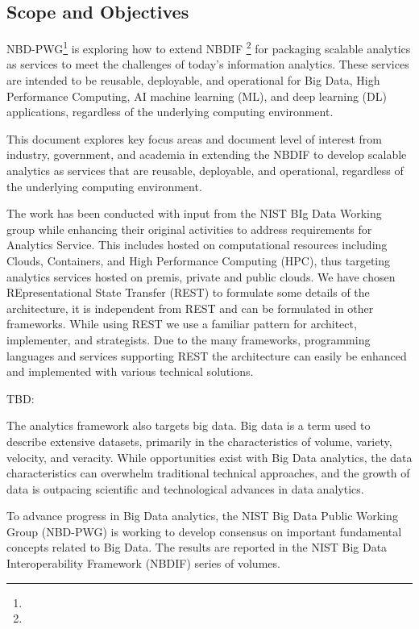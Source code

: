 \begin{description}
{%

\end{description}

\subsection{Scope and Objectives}

NBD-PWG\footnote{} is exploring how to extend NBDIF \footnote{} for packaging scalable
analytics as services to meet the challenges of today's information
analytics. These services are intended to be reusable, deployable, and
operational for Big Data, High Performance Computing, AI machine
learning (ML), and deep learning (DL) applications, regardless of the
underlying computing environment.

This document explores key focus areas and document level of interest
from industry, government, and academia in extending the NBDIF to
develop scalable analytics as services that are reusable, deployable,
and operational, regardless of the underlying computing environment.


The work has been conducted with input from the NIST BIg Data Working
group while enhancing their original activities to address
requirements for Analytics Service. This includes hosted on
computational resources including Clouds, Containers, and High
Performance Computing (HPC), thus targeting analytics services hosted
on premis, private and public clouds. We have chosen REpresentational
State Transfer (REST) to formulate some details of the architecture,
it is independent from REST and can be formulated in other
frameworks. While using REST we use a familiar pattern for architect,
implementer, and strategists. Due to the many frameworks, programming
languages and services supporting REST the architecture can easily be
enhanced and implemented with various technical solutions.


TBD:

The
analytics framework also targets big data.
Big data is a term used to
describe extensive datasets, primarily in the characteristics of
volume, variety, velocity, and veracity. While opportunities exist
with Big Data analytics, the data characteristics can overwhelm
traditional technical approaches, and the growth of data is outpacing
scientific and technological advances in data analytics.

To advance
progress in Big Data analytics, the NIST Big Data Public Working Group
(NBD-PWG) is working to develop consensus on important fundamental
concepts related to Big Data. The results are reported in the NIST Big
Data Interoperability Framework (NBDIF) series of volumes.

